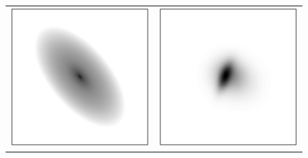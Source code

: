 \documentclass[12pt,pdftex,preprint]{aastex}
\newlength{\figurewidth}
\begin{document}
\begin{figure}
\begin{tabular}{@{}c@{}c@{}}
\includegraphics[width=\figurewidth]{trdemo-03} &
\includegraphics[width=\figurewidth]{trdemo-06} \\

\end{tabular}
\end{figure}
\end{document}
